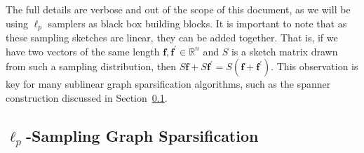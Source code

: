 \documentclass{report}
\DeclareMathOperator*{\argmax}{arg\,max}
\newcommand{\algoname}[1]{\textnormal{\textsc{#1}}}
\begin{document}
The full details are verbose and out of the scope of this document, as we will be using $\ell_p$ samplers as black box building blocks.
%
It is important to note that as these sampling sketches are linear, they can be added together. 
That is, if we have two vectors of the same length $\mathbf{f}, \mathbf{f}^\prime \in \mathbb{R}^n$ and $S$ is a sketch matrix drawn from such a sampling distribution, then $S\mathbf{f} + S\mathbf{f}^\prime = S(\mathbf{f}+\mathbf{f}^\prime)$. 
This observation is key for many sublinear graph sparsification algorithms, such as the spanner construction discussed in  Section~\ref{sec:spanner}. 


\subsection{$\ell_p$-Sampling Graph Sparsification} \label{sec:spanner}
\end{document}
